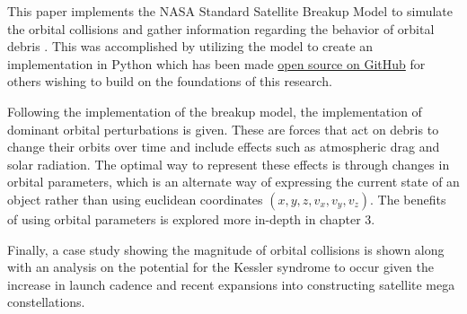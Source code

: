 \documentclass[a4paper, 12pt]{article}
\begin{document}
This paper implements the NASA Standard Satellite Breakup Model to simulate the orbital collisions and gather information regarding the behavior of orbital debris \citep{johnson_nasas_2001}. This was accomplished by utilizing the model to create an implementation in Python which has been made \href{https://github.com/ReeceHumphreys/OrbitalDebris}{open source on GitHub} for others wishing to build on the foundations of this research.

Following the implementation of the breakup model, the implementation of dominant orbital perturbations is given. These are forces that act on debris to change their orbits over time and include effects such as atmospheric drag and solar radiation. The optimal way to represent these effects is through changes in orbital parameters, which is an alternate way of expressing the current state of an object rather than using euclidean coordinates $(x,y,z, v_x, v_y, v_z)$. The benefits of using orbital parameters is explored more in-depth in chapter 3.

Finally, a case study showing the magnitude of orbital collisions is shown along with an analysis on the potential for the Kessler syndrome to occur given the increase in launch cadence and recent expansions into constructing satellite mega constellations.
\end{document}
